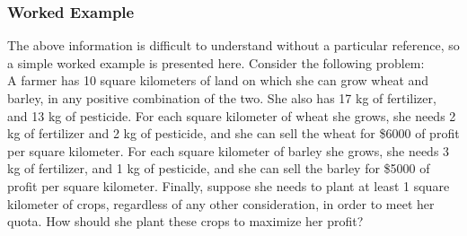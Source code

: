 \documentclass[10pt]{article}
\newenvironment{exampleblock}[1]{\tcolorbox[beamer,noparskip,breakable,title={#1}]}{\endtcolorbox}
\begin{document}
\subsubsection{Worked Example}
The above information is difficult to understand without a particular reference, so a simple worked example is presented here. Consider the following problem: \\
\begin{exampleblock}{Linear Programming Example Problem}
	A farmer has 10 square kilometers of land on which she can grow wheat and barley, in any positive combination of the two. She also has 17 kg of fertilizer, and 13 kg of pesticide. For each square kilometer of wheat she grows, she needs 2 kg of fertilizer and 2 kg of pesticide, and she can sell the wheat for \$6000 of profit per square kilometer. For each square kilometer of barley she grows, she needs 3 kg of fertilizer, and 1 kg of pesticide, and she can sell the barley for \$5000 of profit per square kilometer. Finally, suppose she needs to plant at least 1 square kilometer of crops, regardless of any other consideration, in order to meet her quota. How should she plant these crops to maximize her profit?
\end{exampleblock}
\end{document}
